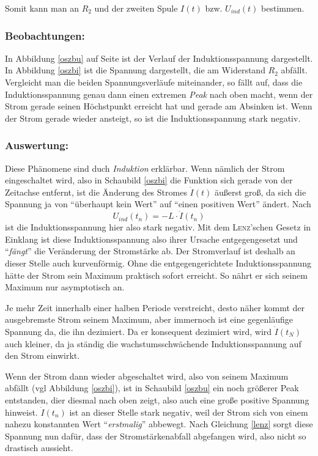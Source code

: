 Somit kann man an \(R_2\) und der zweiten Spule \(I(t)\) bzw. \(U_{ind}(t)\) bestimmen.


		\subsubsection*{Beobachtungen:}
In Abbildung \ref{oszbu} auf Seite \pageref{oszbu} ist der Verlauf der Induktionsspannung dargestellt. In Abbildung \ref{oszbi} ist die Spannung dargestellt, die am Widerstand \(R_2\) abfällt. Vergleicht man die beiden Spannungsverläufe miteinander, so fällt auf, dass die Induktionsspannung	genau dann einen extremen \textit{Peak} nach oben macht, wenn der Strom gerade seinen Höchstpunkt erreicht hat und gerade am Absinken ist. Wenn der Strom gerade wieder ansteigt, so ist die Induktionsspannung stark negativ.


		\subsubsection*{Auswertung:}
Diese Phänomene sind duch \textit{Induktion} erklärbar. Wenn nämlich der Strom eingeschaltet wird, also in Schaubild \ref{oszbi} die Funktion sich gerade von der Zeitachse entfernt, ist die Änderung des Stromes \(\dot{I}(t)\) äußerst groß, da sich die Spannung ja von "`überhaupt kein Wert"' auf "`einen positiven Wert"' ändert. Nach 
\begin{equation}
	U_{ind}(t_n) = - L \cdot \dot{I}(t_n)
	 \label{lenz}
\end{equation}
ist die Induktionsspannung hier also stark negativ. Mit dem \textsc{Lenz}'schen Gesetz in Einklang ist diese Induktionsspannung also ihrer Ursache entgegengesetzt und "`\textit{fängt}"' die Veränderung der Stromstärke ab. Der Stromverlauf ist deshalb an dieser Stelle auch kurvenförmig. Ohne die entgegengerichtete Induktionsspannung hätte der Strom sein Maximum praktisch sofort erreicht. So nährt er sich seinem Maximum nur asymptotisch an.

Je mehr Zeit innerhalb einer halben Periode verstreicht, desto näher kommt der ausgebremste Strom seinem Maximum, aber immernoch ist eine gegenläufige Spannung da, die ihn dezimiert. Da er konsequent dezimiert wird, wird \(\dot{I}(t_N)\) auch kleiner, da ja ständig die wachstumsschwächende Induktionsspannung auf den Strom einwirkt.

Wenn der Strom dann wieder abgeschaltet wird, also von seinem Maximum abfällt (vgl Abbildung \ref{oszbi}), ist in Schaubild \ref{oszbu} ein noch größerer Peak entstanden, dier diesmal nach oben zeigt, also auch eine große positive Spannung hinweist. \(\dot{I}(t_n)\) ist an dieser Stelle stark negativ, weil der Strom sich von einem nahezu konstannten Wert "`\textit{erstmalig}"' abbewegt. Nach Gleichung \ref{lenz} sorgt diese Spannung nun dafür, dass der Stromstärkenabfall abgefangen wird, also nicht so drastisch aussieht.


